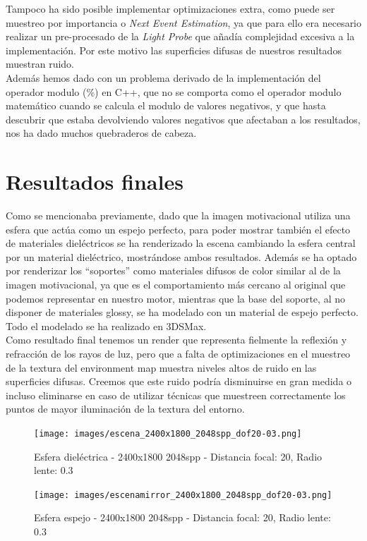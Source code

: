 \documentclass[10pt,oneside,a4paper]{article}
\begin{document}
Tampoco ha sido posible implementar optimizaciones extra, como puede ser muestreo por importancia o \emph{Next Event Estimation}, ya que para ello era necesario realizar un pre-procesado de la \emph{Light Probe} que añadía complejidad excesiva a la implementación. Por este motivo las superficies difusas de nuestros resultados muestran ruido.\\

Además hemos dado con un problema derivado de la implementación del operador modulo (\%) en C++, que no se comporta como el operador modulo matemático cuando se calcula el modulo de valores negativos, y que hasta descubrir que estaba devolviendo valores negativos que afectaban a los resultados, nos ha dado muchos quebraderos de cabeza.

\newpage
\section{Resultados finales}
Como se mencionaba previamente, dado que la imagen motivacional utiliza una esfera que actúa como un espejo perfecto, para poder mostrar también el efecto de materiales dieléctricos se ha renderizado la escena cambiando la esfera central por un material dieléctrico, mostrándose ambos resultados. Además se ha optado por renderizar los ``soportes'' como materiales difusos de color similar al de la imagen motivacional, ya que es el comportamiento más cercano al original que podemos representar en nuestro motor, mientras que la base del soporte, al no disponer de materiales glossy, se ha modelado con un material de espejo perfecto. Todo el modelado se ha realizado en 3DSMax.\\

Como resultado final tenemos un render que representa fielmente la reflexión y refracción de los rayos de luz, pero que a falta de optimizaciones en el muestreo de la textura del environment map muestra niveles altos de ruido en las superficies difusas. Creemos que este ruido podría disminuirse en gran medida o incluso eliminarse en caso de utilizar técnicas que muestreen correctamente los puntos de mayor iluminación de la textura del entorno.

\begin{figure}[h]
\centering
\texttt{[image: images/escena\_2400x1800\_2048spp\_dof20-03.png]}
\caption{Esfera dieléctrica - 2400x1800 2048spp - Distancia focal: 20, Radio lente: 0.3}
\label{fig:disp}
\end{figure}

\begin{figure}[h]
\centering
\texttt{[image: images/escenamirror\_2400x1800\_2048spp\_dof20-03.png]}
\caption{Esfera espejo - 2400x1800 2048spp - Distancia focal: 20, Radio lente: 0.3}
\label{fig:disp}
\end{figure}
\end{document}
